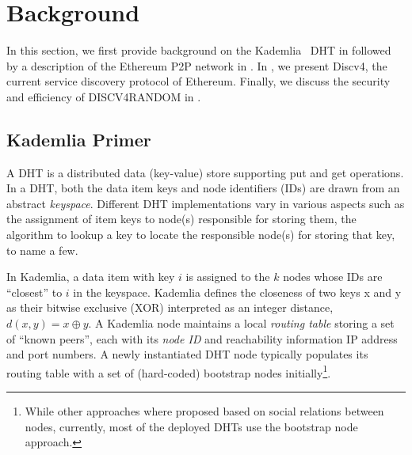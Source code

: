 


\section{Background}
\label{sec:background}

In this section, we first provide background on the Kademlia~\cite{maymounkov2002kademlia} DHT in  followed by a description of the Ethereum P2P network in .  In , we present Discv4, the current service discovery protocol of Ethereum. Finally, we discuss the security and efficiency of DISCV4RANDOM in . 

\subsection{Kademlia Primer}
\label{sec:kademlia}

 A DHT is a distributed data (\ie key-value) store supporting put and get operations. In a DHT,
 both the data item keys and node identifiers (\ie IDs) are drawn from an abstract \textit{keyspace}. Different DHT implementations vary in various aspects such as the assignment of item keys to node(s) responsible for storing them, the algorithm to lookup a key to locate the responsible node(s) for storing that key, to name a few.

 In Kademlia, a data item with key $i$ is assigned to the $k$ nodes whose IDs are ``closest'' to $i$ in the keyspace. Kademlia defines the closeness of two keys x and y as their bitwise exclusive (XOR) interpreted as an integer distance, \ie $d(x,y) = x \oplus y$. A Kademlia node maintains a local \textit{routing table} storing a set of ``known peers'', each with its \textit{node ID} and reachability information \ie IP address and port numbers. A newly instantiated DHT node typically populates its routing table with a set of (hard-coded) bootstrap nodes initially\footnote{While other approaches where proposed based on social relations between nodes, currently, most of the deployed DHTs use the bootstrap node approach.}. 

